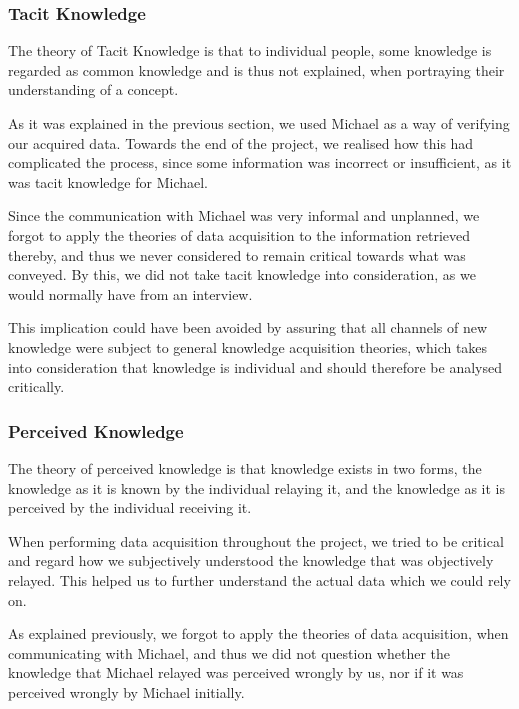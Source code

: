 \subsubsection{Tacit Knowledge}

The theory of Tacit Knowledge is that to individual people, some knowledge is regarded as common knowledge and is thus not explained, when portraying their understanding of a concept.

As it was explained in the previous section, we used Michael as a way of verifying our acquired data. Towards the end of the project, we realised how this had complicated the process, since some information was incorrect or insufficient, as it was tacit knowledge for Michael.

Since the communication with Michael was very informal and unplanned, we forgot to apply the theories of data acquisition to the information retrieved thereby, and thus we never considered to remain critical towards what was conveyed. By this, we did not take tacit knowledge into consideration, as we would normally have from an interview.

This implication could have been avoided by assuring that all channels of new knowledge were subject to general knowledge acquisition theories, which takes into consideration that knowledge is individual and should therefore be analysed critically.

\subsubsection{Perceived Knowledge}

The theory of perceived knowledge is that knowledge exists in two forms, the knowledge as it is known by the individual relaying it, and the knowledge as it is perceived by the individual receiving it.

When performing data acquisition throughout the project, we tried to be critical and regard how we subjectively understood the knowledge that was objectively relayed. This helped us to further understand the actual data which we could rely on.

As explained previously, we forgot to apply the theories of data acquisition, when communicating with Michael, and thus we did not question whether the knowledge that Michael relayed was perceived wrongly by us, nor if it was perceived wrongly by Michael initially.

